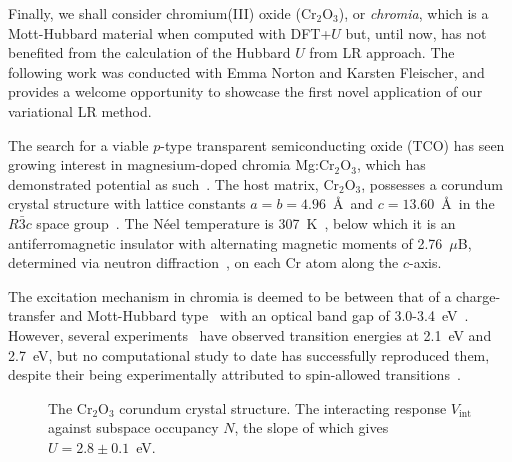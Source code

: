 %
Finally, 
we shall consider chromium(III) oxide (Cr$_2$O$_3$), or {\it chromia}, 
which is a Mott-Hubbard material 
when computed with DFT+$U$ but, 
until now, has not benefited from 
the calculation of the Hubbard $U$ 
from LR approach.
%
The following work was conducted with 
Emma Norton and Karsten Fleischer, 
and provides a welcome opportunity 
to showcase the first novel application 
of our variational LR method.

The search for a viable $p$-type 
transparent semiconducting oxide (TCO) 
has seen growing interest in 
magnesium-doped chromia Mg:Cr$_2$O$_3$, 
which has demonstrated potential as 
such~\cite{doi:10.1063/1.3638461,0953-8984-28-12-125501,PhysRevB.91.125202,PhysRevB.93.115302}.
%
The host matrix, Cr$_2$O$_3$, 
possesses a corundum crystal structure with lattice 
constants $a=b=4.96$~\AA\  and $c=13.60$~\AA\  
in the $R\bar{3}c$ space group~\cite{Gloege1999L917}.
%
The N\'eel temperature is 307~K~\cite{PhysRevB.15.4451,YACOVITCH19771126}, 
below which it is an antiferromagnetic insulator 
with alternating magnetic moments of 
2.76~$\mu$B, 
{determined via neutron diffraction}~\cite{doi:10.1063/1.1714118},
on each Cr atom along the $c$-axis.

The excitation mechanism in chromia 
is deemed to be between that of a charge-transfer and 
Mott-Hubbard type~\cite{CATTI19961735,PhysRevB.70.125426} 
with an optical band gap of 
3.0-3.4~eV~\cite{FISCHER19712455,doi:10.1063/1.1702871,doi:10.1063/1.1714118,HOLT1997201,PhysRevB.91.125202}.
%
However, several 
experiments~\cite{FISCHER19712455,HOWNG198075,PhysRevB.91.125202,doi:10.1021/jp404230k} 
have observed transition energies at 2.1~eV and 2.7~eV, 
but no computational study to date has 
successfully reproduced them, 
despite their being experimentally 
attributed to spin-allowed 
transitions~\cite{PhysRevB.57.9586}.

\begin{figure}[th!]
\centering
{}
\quad
%
%
\caption[Cr$_2$O$_3$ crystal structure and linear-response calculation]
{\subref{fig:cr2o3_structure} 
The Cr$_2$O$_3$ corundum crystal structure.
The interacting response $V_\textrm{int}$ 
against subspace occupancy $N$, 
the slope of which gives 
$U=2.8\pm0.1$~eV.}
\end{figure}


